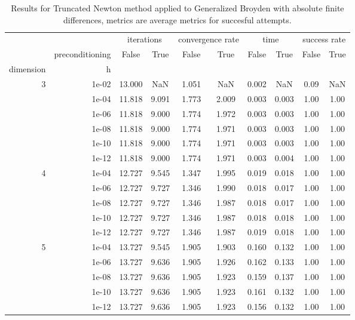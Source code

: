 \begin{table}
\centering
\caption{Results for Truncated Newton method applied to Generalized Broyden with absolute finite differences, metrics are average metrics for succesful attempts.}
\label{tab:Truncated_Newton_Generalized_Broyden_fd_abs}
\begin{tabular}{rr|cc|cc|cc|cc}
\toprule
    &  & \multicolumn{2}{|c}{iterations} & \multicolumn{2}{|c}{convergence rate} & \multicolumn{2}{|c}{time} & \multicolumn{2}{|c}{success rate} \\
    & preconditioning & False & True & False & True & False & True & False & True \\
dimension & h &  &  &  &  &  &  &  &  \\
\midrule
\multirow[t]{6}{*}{3} & 1e-02 & 13.000 & NaN & 1.051 & NaN & 0.002 & NaN & 0.09 & NaN \\
    & 1e-04 & 11.818 & 9.091 & 1.773 & 2.009 & 0.003 & 0.003 & 1.00 & 1.00 \\
    & 1e-06 & 11.818 & 9.000 & 1.774 & 1.972 & 0.003 & 0.003 & 1.00 & 1.00 \\
    & 1e-08 & 11.818 & 9.000 & 1.774 & 1.971 & 0.003 & 0.003 & 1.00 & 1.00 \\
    & 1e-10 & 11.818 & 9.000 & 1.774 & 1.971 & 0.003 & 0.003 & 1.00 & 1.00 \\
    & 1e-12 & 11.818 & 9.000 & 1.774 & 1.971 & 0.003 & 0.004 & 1.00 & 1.00 \\
\cline{1-10}
\multirow[t]{5}{*}{4} & 1e-04 & 12.727 & 9.545 & 1.347 & 1.995 & 0.019 & 0.018 & 1.00 & 1.00 \\
    & 1e-06 & 12.727 & 9.727 & 1.346 & 1.990 & 0.018 & 0.017 & 1.00 & 1.00 \\
    & 1e-08 & 12.727 & 9.727 & 1.346 & 1.987 & 0.018 & 0.017 & 1.00 & 1.00 \\
    & 1e-10 & 12.727 & 9.727 & 1.346 & 1.987 & 0.018 & 0.018 & 1.00 & 1.00 \\
    & 1e-12 & 12.727 & 9.727 & 1.346 & 1.987 & 0.019 & 0.018 & 1.00 & 1.00 \\
\cline{1-10}
\multirow[t]{5}{*}{5} & 1e-04 & 13.727 & 9.545 & 1.905 & 1.903 & 0.160 & 0.132 & 1.00 & 1.00 \\
    & 1e-06 & 13.727 & 9.636 & 1.905 & 1.926 & 0.162 & 0.133 & 1.00 & 1.00 \\
    & 1e-08 & 13.727 & 9.636 & 1.905 & 1.923 & 0.159 & 0.137 & 1.00 & 1.00 \\
    & 1e-10 & 13.727 & 9.636 & 1.905 & 1.923 & 0.161 & 0.132 & 1.00 & 1.00 \\
    & 1e-12 & 13.727 & 9.636 & 1.905 & 1.923 & 0.156 & 0.132 & 1.00 & 1.00 \\
\cline{1-10}
\bottomrule
\end{tabular}
\end{table}

